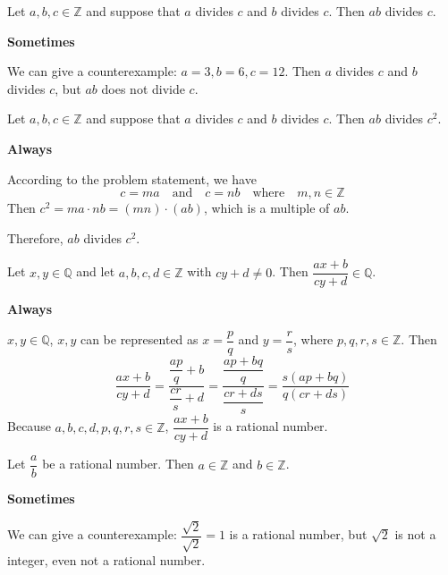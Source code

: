 \begin{chapex} %
Let $a,b,c \in \mathbb{Z}$ and suppose that $a$ divides $c$ and $b$ divides $c$. Then $ab$ divides $c$.
\end{chapex}

\begin{mysolution}
    \textbf{Sometimes}

    We can give a counterexample: $a=3, b=6, c=12$. Then $a$ divides $c$ and $b$ divides $c$, but $ab$ does not divide $c$.
\end{mysolution}

\begin{chapex} %
Let $a,b,c \in \mathbb{Z}$ and suppose that $a$ divides $c$ and $b$ divides $c$. Then $ab$ divides $c^2$.
\end{chapex}

\begin{mysolution}
    \textbf{Always}

    According to the problem statement, we have
    \[c = ma \quad \text{and} \quad c = nb \quad \text{where} \quad m,n \in \mathbb{Z}\]
    Then $c^2 = ma \cdot nb = (mn)\cdot(ab)$, which is a multiple of $ab$.

    Therefore, $ab$ divides $c^2$.
\end{mysolution}

\begin{chapex} %
Let $x,y \in \mathbb{Q}$ and let $a,b,c,d \in \mathbb{Z}$ with $cy+d \ne 0$. Then $\dfrac{ax+b}{cy+d} \in \mathbb{Q}$.
\end{chapex}

\begin{mysolution}
    \textbf{Always}

    $x,y \in \mathbb{Q}$, $x, y$ can be represented as $x=\dfrac{p}{q}$ and $y=\dfrac{r}{s}$, where $p,q,r,s \in \mathbb{Z}$. Then
    \[\dfrac{ax+b}{cy+d} = \dfrac{\dfrac{ap}{q}+b}{\dfrac{cr}{s}+d} = \dfrac{\dfrac{ap+bq}{q}}{\dfrac{cr+ds}{s}} = \dfrac{s(ap+bq)}{q(cr+ds)}\]
    Because $a, b,c,d,p,q,r,s \in \mathbb{Z}$, $\dfrac{ax+b}{cy+d}$ is a rational number.
\end{mysolution}

\begin{chapex} %
Let $\dfrac{a}{b}$ be a rational number. Then $a \in \mathbb{Z}$ and $b \in \mathbb{Z}$.
\end{chapex}

\begin{mysolution}
    \textbf{Sometimes}

    We can give a counterexample: $\dfrac{\sqrt{2}}{\sqrt{2}} = 1$ is a rational number, but $\sqrt{2}$ is not a integer, even not a rational number.
\end{mysolution}

